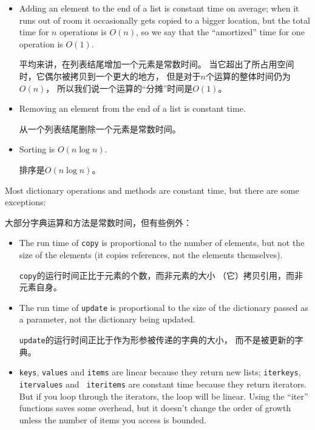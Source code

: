 \documentclass[10pt]{book}
\begin{document}
\begin{CJK}{UTF8}{gbsn}
\begin{itemize}
\item Adding an element to the end of a list is constant time on
average; when it runs out of room it occasionally gets copied
to a bigger location, but the total time for $n$ operations
is $O(n)$, so we say that the ``amortized'' time for one
operation is $O(1)$.

平均来讲，在列表结尾增加一个元素是常数时间。
当它超出了所占用空间时，它偶尔被拷贝到一个更大的地方，
但是对于$n$个运算的整体时间仍为$O(n)$，
所以我们说一个运算的``分摊''时间是$O(1)$。

\item Removing an element from the end of a list is constant time.

从一个列表结尾删除一个元素是常数时间。

\item Sorting is $O(n \log n)$.

排序是$O(n \log n)$。

\end{itemize}

Most dictionary operations and methods are constant time, but
there are some exceptions:

大部分字典运算和方法是常数时间，但有些例外：

\begin{itemize}

\item The run time of {\tt copy} is proportional to the number of
  elements, but not the size of the elements (it copies references,
  not the elements themselves).
  
{\tt copy}的运行时间正比于元素的个数，而非元素的大小
（它）拷贝引用，而非元素自身。

\item The run time of {\tt update} is
  proportional to the size of the dictionary passed as a parameter,
  not the dictionary being updated.

{\tt update}的运行时间正比于作为形参被传递的字典的大小，
而不是被更新的字典。

\item {\tt keys}, {\tt values} and {\tt items} are linear because they
  return new lists; {\tt iterkeys}, {\tt itervalues} and {\tt
    iteritems} are constant time because they return iterators.  But
  if you loop through the iterators, the loop will be linear.  Using
  the ``iter'' functions saves some overhead, but it doesn't change
  the order of growth unless the number of items you access is
  bounded.


\end{itemize}
\end{CJK}
\end{document}
